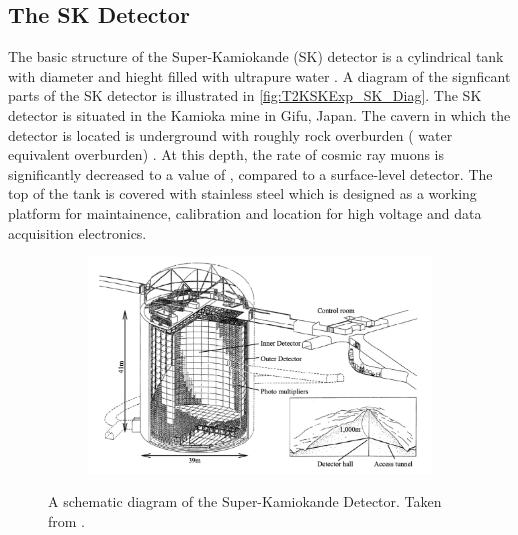 \subsection{The SK Detector}
\label{subsec:T2KSKExp_SKDetector}

The basic structure of the Super-Kamiokande (SK) detector is a cylindrical tank with diameter  and hieght  filled with ultrapure water \cite{Abe_2014_SKCalib}. A diagram of the signficant parts of the SK detector is illustrated in \autoref{fig:T2KSKExp_SK_Diag}. The SK detector is situated in the Kamioka mine in Gifu, Japan. The cavern in which the detector is located is underground with roughly  rock overburden ( water equivalent overburden) \cite{Fukuda2003-ly}. At this depth, the rate of cosmic ray muons is significantly decreased to a value of , compared to a surface-level detector. The top of the tank is covered with stainless steel which is designed as a working platform for maintainence, calibration and location for high voltage and data acquisition electronics.

\begin{figure}[h]
  \begin{subfigure}[t]{0.95\textwidth}
    \includegraphics[width=\textwidth, trim={0mm 0mm 0mm 0mm}, clip,page=1]{Figures/Detectors/SKDiagram.pdf}
  \end{subfigure}
  \caption{A schematic diagram of the Super-Kamiokande Detector. Taken from \cite{Itow2001-bc}.}
  \label{fig:T2KSKExp_SK_Diag}
\end{figure}

